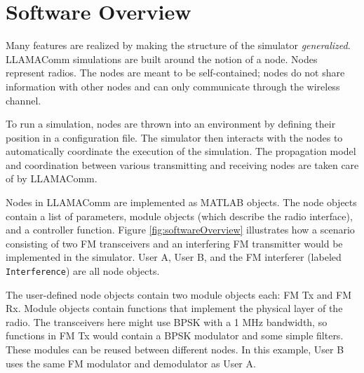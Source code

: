 \section{Software Overview}

Many features are realized by making the structure of the
simulator \emph{generalized}.  LLAMAComm simulations are built
around the notion of a node.  Nodes represent radios.  The nodes are
meant to be self-contained; nodes do not share information with
other nodes and can only communicate through the wireless channel.

To run a simulation, nodes are thrown into an environment by
defining their position in a configuration file.  The simulator then
interacts with the nodes to automatically coordinate the execution
of the simulation.  The propagation model and coordination between
various transmitting and receiving nodes are taken care of by
LLAMAComm.

Nodes in LLAMAComm are implemented as MATLAB objects.  The node
objects contain a list of parameters, module objects (which describe
the radio interface), and a controller function. Figure
\ref{fig:softwareOverview} illustrates how a scenario consisting of
two FM transceivers and an interfering FM transmitter would be
implemented in the simulator. User A, User B, and the FM interferer
(labeled \verb+Interference+) are all node objects.

The user-defined node objects contain two module objects each: FM Tx
and FM Rx.  Module objects contain functions that implement the
physical layer of the radio.  The transceivers here might use BPSK
with a 1 MHz bandwidth, so functions in FM Tx would contain a BPSK
modulator and some simple filters.  These modules can be reused
between different nodes.  In this example, User B uses the same FM
modulator and demodulator as User A.

